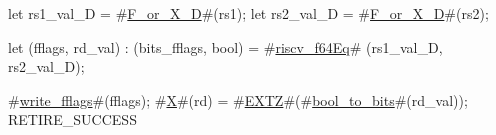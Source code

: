 let rs1_val_D = #\hyperref[sailRISCVzFzyorzyXzyD]{F\_or\_X\_D}#(rs1);
let rs2_val_D = #\hyperref[sailRISCVzFzyorzyXzyD]{F\_or\_X\_D}#(rs2);

let (fflags, rd_val) : (bits_fflags, bool) =
    #\hyperref[sailRISCVzriscvzyf64Eq]{riscv\_f64Eq}# (rs1_val_D, rs2_val_D);

#\hyperref[sailRISCVzwritezyfflags]{write\_fflags}#(fflags);
#\hyperref[sailRISCVzX]{X}#(rd) = #\hyperref[sailRISCVzEXTZ]{EXTZ}#(#\hyperref[sailRISCVzboolzytozybits]{bool\_to\_bits}#(rd_val));
RETIRE_SUCCESS
